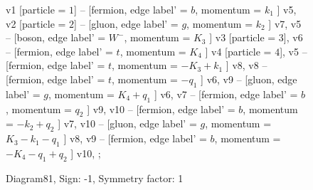 \documentclass{revtex4}
\begin{document}
\begin{figure}[!htb]
\begin{center}
{    %
v1 [particle = \(1\)] -- [fermion, edge label' = \(b\), momentum = \(k_{1}\) ] v5, 
v2 [particle = \(2\)] -- [gluon, edge label' = \(g\), momentum = \(k_{2}\) ] v7, 
v5 -- [boson, edge label' = \(W^{-}\), momentum = \(K_{3}\) ] v3 [particle = \(3\)], 
v6 -- [fermion, edge label' = \(t\), momentum = \(K_{4}\) ] v4 [particle = \(4\)], 
v5 -- [fermion, edge label' = \(t\), momentum = \(-K_{3} + k_{1}\) ] v8, 
v8 -- [fermion, edge label' = \(t\), momentum = \(-q_{1}\) ] v6, 
v9 -- [gluon, edge label' = \(g\), momentum = \(K_{4} + q_{1}\) ] v6, 
v7 -- [fermion, edge label' = \(b\), momentum = \(q_{2}\) ] v9, 
v10 -- [fermion, edge label' = \(b\), momentum = \(-k_{2} + q_{2}\) ] v7, 
v10 -- [gluon, edge label' = \(g\), momentum = \(K_{3} - k_{1} - q_{1}\) ] v8, 
v9 -- [fermion, edge label' = \(b\), momentum = \(-K_{4} - q_{1} + q_{2}\) ] v10, 
};
\end{center}
\caption{Diagram81, Sign: -1, Symmetry factor: 1}
\end{figure}
\newpage
\end{document}
